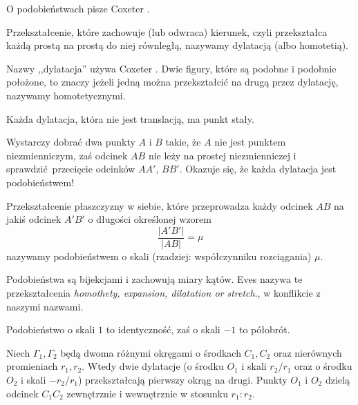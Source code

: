%

O podobieństwach pisze Coxeter \cite[s. 84-92]{coxeter_1967}.

\begin{definition}[homotetia]
    Przekształcenie, które zachowuje (lub odwraca) kierunek, czyli przekształca każdą prostą na prostą do niej równległą, nazywamy dylatacją (albo homotetią).
\end{definition}

Nazwy ,,dylatacja'' używa Coxeter \cite[s. 84]{coxeter_1967}.
Dwie figury, które są podobne i podobnie położone, to znaczy jeżeli jedną można przekształcić na drugą przez dylatację, nazywamy homotetycznymi.

\begin{proposition}
    Każda dylatacja, która nie jest translacją, ma punkt stały.
\end{proposition}

Wystarczy dobrać dwa punkty $A$ i $B$ takie, że $A$ nie jest punktem niezmienniczym, zaś odcinek $AB$ nie leży na prostej niezmienniczej i sprawdzić przecięcie odcinków $AA'$, $BB'$.
Okazuje się, że każda dylatacja jest podobieństwem!

\begin{definition}[podobieństwo]
    Przekształcenie płaszczyzny w siebie, które przeprowadza każdy odcinek $AB$ na jakiś odcinek $A'B'$ o długości określonej wzorem
    \begin{equation}
        \frac{|A'B'|}{|AB|} = \mu
    \end{equation}
    nazywamy podobieństwem o skali (rzadziej: współczynniku rozciągania) $\mu$.
\end{definition}

Podobieństwa są bijekcjami i zachowują miary kątów.
Eves \cite[s. 105]{eves1_1972} nazywa te przekształcenia \emph{homothety, expansion, dilatation or stretch}., w konflikcie z naszymi nazwami.

\begin{example}
    Podobieństwo o skali $1$ to identyczność, zaś o skali $-1$ to półobrót. 
\end{example}

\begin{proposition}
    Niech $\Gamma_1, \Gamma_2$ będą dwoma różnymi okręgami o środkach $C_1, C_2$ oraz nierównych promieniach $r_1, r_2$.
    Wtedy dwie dylatacje (o środku $O_1$ i skali $r_2/r_1$ oraz o środku $O_2$ i skali $-r_2/r_1$) przekształcają pierwszy okrąg na drugi.
    Punkty $O_1$ i $O_2$ dzielą odcinek $C_1 C_2$ zewnętrznie i wewnętrznie w stosunku $r_1 : r_2$.
\end{proposition}

